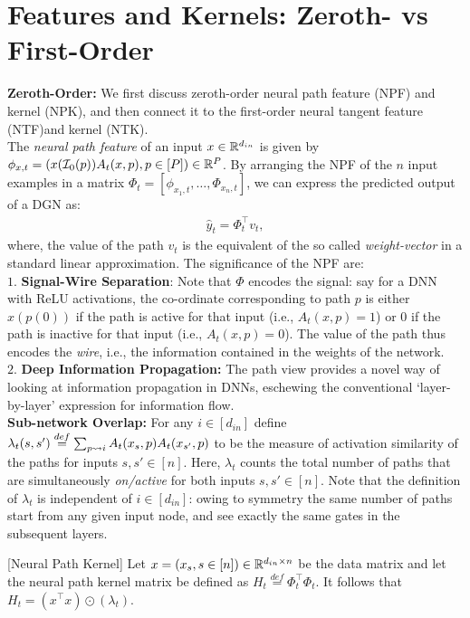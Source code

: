 \section{Features and Kernels: Zeroth- vs First-Order}
\textbf{Zeroth-Order:} We first discuss zeroth-order neural path feature (NPF) and kernel (NPK), and then connect it to the first-order neural tangent feature  (NTF)and kernel (NTK).\hfill\\
The \emph{neural path feature} of an input $x\in \mathbb{R}^{d_{in}}$ is given by $\phi_{x,t}=(x(\mathcal{I}_0(p))A_t(x,p) ,p\in[P])\in\mathbb{R}^P$. By arranging the NPF of the $n$ input examples in a matrix $\Phi_t=\left[\phi_{x_1,t},\ldots, \Phi_{x_n,t}\right]$, we can express the predicted output of a DGN as: \begin{align}\label{eq:npfbasic}\hat{y}_t=\Phi_t^\top v_t,\end{align}
where, the value of the path $v_t$ is the equivalent of the so called \emph{weight-vector} in a standard linear approximation. The significance of the NPF are:\hfill\\
$1.$ \textbf{Signal-Wire Separation}: Note that $\Phi$ encodes the signal: say for a DNN with ReLU activations, the co-ordinate corresponding to path $p$ is either $x(p(0))$ if the path is active for that input (i.e., $A_t(x,p)=1$) or $0$ if the path is inactive for that input  (i.e., $A_t(x,p)=0$). The value of the path thus encodes the \emph{wire}, i.e., the information contained in the weights of the network. \hfill\\
$2.$ \textbf{Deep Information Propagation:} The path view provides a novel way of looking at information propagation in DNNs, eschewing the conventional `layer-by-layer' expression for information flow.\hfill\\
\textbf{Sub-network Overlap:} For any $i\in [d_{in}]$ define $\lambda_t(s,s')\stackrel{def}{=}\sum_{p\rightsquigarrow i} A_t(x_s,p) A_t(x_{s'},p)$ to be the measure of activation similarity of the paths for inputs $s,s'\in[n]$. Here, $\lambda_t$ counts the total number of paths that are simultaneously \emph{on/active} for both inputs $s,s'\in[n]$. Note that the definition of $\lambda_t$ is independent of $i\in [d_{in}]$: owing to symmetry the same number of paths start from any given input node, and see exactly the same gates in the subsequent layers.
\begin{lemma}\label{lm:npk}[Neural Path Kernel] Let $x=(x_s,s\in [n])\in\mathbb{R}^{d_{in}\times n}$ be the data matrix and let the neural path kernel matrix be defined as $H_t\stackrel{def}=\Phi^\top_t\Phi_t$. It follows that $H_t= (x^\top x)\odot(\lambda_t)$. \end{lemma}
